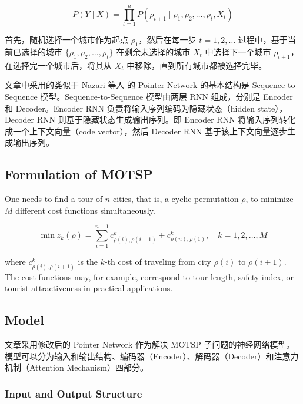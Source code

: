 \documentclass[fontset=none]{ctexart}
\begin{document}
\begin{equation}
    P(Y \mid X) = \prod_{t=1}^{n} P(\rho_{t + 1} \mid \rho_1, \rho_2, \ldots, \rho_{t}, X_t)
\end{equation}

首先，随机选择一个城市作为起点 $\rho_1$，然后在每一步 $t = 1, 2, \ldots$ 过程中，基于当前已选择的城市 $\{\rho_1, \rho_2, \ldots, \rho_t\}$ 在剩余未选择的城市 $X_t$ 中选择下一个城市 $\rho_{t + 1}$，在选择完一个城市后，将其从 $X_t$ 中移除，直到所有城市都被选择完毕。

文章中采用的类似于 Nazari 等人\cite{nazariReinforcementLearningSolving2018} 的 Pointer Network 的基本结构是 Sequence-to-Sequence 模型\cite{sutskeverSequenceSequenceLearning2014}。Sequence-to-Sequence 模型由两层 RNN 组成，分别是 Encoder 和 Decoder。Encoder RNN 负责将输入序列编码为隐藏状态（hidden state），Decoder RNN 则基于隐藏状态生成输出序列。即 Encoder RNN 将输入序列转化成一个上下文向量（code vector），然后 Decoder RNN 基于该上下文向量逐步生成输出序列。

\subsection{Formulation of MOTSP}

One needs to find a tour of $n$ cities, that is, a cyclic permutation $\rho$, to minimize $M$ different cost functions simultaneously. 

\begin{equation}
    \min z_k(\rho) = \sum_{i=1}^{n - 1} c^k_{\rho(i), \rho(i + 1)} + c^k_{\rho(n), \rho(1)}, \quad k = 1, 2, \ldots, M
\end{equation}

where $c^k_{\rho(i),\rho(i + 1)}$ is the $k$-th cost of traveling from city $\rho(i)$ to $\rho(i + 1)$. The cost functions may, for example, correspond to tour length, safety index, or tourist attractiveness in practical applications.

\subsection{Model}

文章采用修改后的 Pointer Network\cite{vinyalsPointerNetworks2015} 作为解决 MOTSP 子问题的神经网络模型。模型可以分为输入和输出结构、编码器（Encoder）、解码器（Decoder）和注意力机制（Attention Mechanism）四部分。

\subsubsection{Input and Output Structure}
\end{document}
